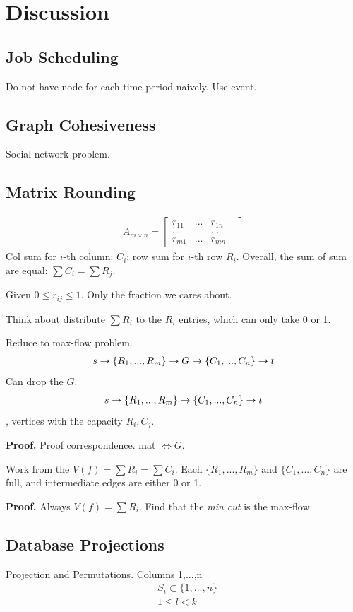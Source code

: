 \documentclass[a4paper]{report}
\theoremstyle{definition}
\begin{document}
\section{Discussion}
\subsection{Job Scheduling}
Do not have node for each time period naively. Use event.
\subsection{Graph Cohesiveness}
Social network problem.

\subsection{Matrix Rounding}
\begin{align*}
A_{m\times n} = \begin{bmatrix}
r_{11} & ... & r_{1n} \\
... & &...&\\
r_{m1} & ... & r_{mn}
\end{bmatrix}
\end{align*}
Col sum for $i$-th column: $C_i$; row sum for $i$-th row $R_i$. Overall, the sum of sum are equal: $\sum C_i = \sum R_j$.

Given $0 \leq r_{ij}\leq 1$. Only the fraction we cares about.

Think about distribute $\sum R_i$ to the $R_i$ entries, which can only take 0 or 1.

Reduce to max-flow problem.
\begin{align*}
s \rightarrow \{R_1, ..., R_m\} \rightarrow G \rightarrow \{C_1, ..., C_n\} \rightarrow t
\end{align*}
Can drop the $G$.
\begin{align*}
s \rightarrow \{R_1, ..., R_m\} \rightarrow \{C_1, ..., C_n\} \rightarrow t
\end{align*}
, vertices with the capacity $R_i, C_j$.


\textbf{Proof.} Proof correspondence. mat $\Leftrightarrow G$.

Work from the $V(f)=\sum R_i =\sum C_i$. Each $\{R_1, ..., R_m\}$ and $\{C_1, ..., C_n\}$ are full, and intermediate edges are either 0 or 1.

\textbf{Proof.} Always $V(f)=\sum R_i$. Find that the \textit{min cut} is the max-flow.
\subsection{Database Projections}
Projection and Permutations.
Columns 1,...,n
\begin{align*}
& S_i \subset \{1,..., n\}\\
& 1 \leq l < k
\end{align*}
\end{document}
